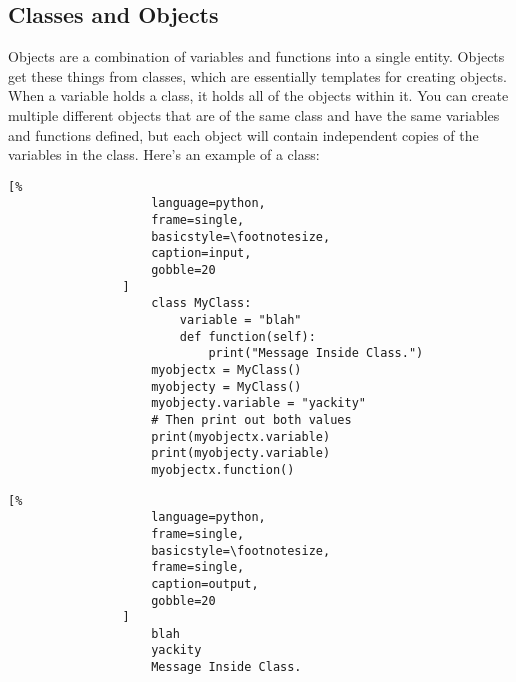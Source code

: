 \documentclass[crop=false,class=book]{standalone}
\begin{document}
        \subsection{Classes and Objects}
            Objects are a combination of variables and functions into
            a single entity. Objects get these things from classes,
            which are essentially templates for creating objects.
            When a variable holds a class, it holds all of the
            objects within it. You can create multiple different
            objects that are of the same class and have the same
            variables and functions defined, but each object will
            contain independent copies of the variables in the class.
            Here's an example of a class:\newline
            \begin{minipage}[t]{.48\textwidth}
                \centering
                \begin{lstlisting}[%
                    language=python,
                    frame=single,
                    basicstyle=\footnotesize,
                    caption=input,
                    gobble=20
                ]
                    class MyClass:
                        variable = "blah"
                        def function(self):
                            print("Message Inside Class.")
                    myobjectx = MyClass()
                    myobjecty = MyClass()
                    myobjecty.variable = "yackity"
                    # Then print out both values
                    print(myobjectx.variable)
                    print(myobjecty.variable)
                    myobjectx.function()
                \end{lstlisting}
            \end{minipage}\hfill
            \begin{minipage}[t]{.48\textwidth}
                \centering
                \begin{lstlisting}[%
                    language=python,
                    frame=single,
                    basicstyle=\footnotesize,
                    frame=single,
                    caption=output,
                    gobble=20
                ]
                    blah
                    yackity
                    Message Inside Class.
                \end{lstlisting}
            \end{minipage}
\end{document}
